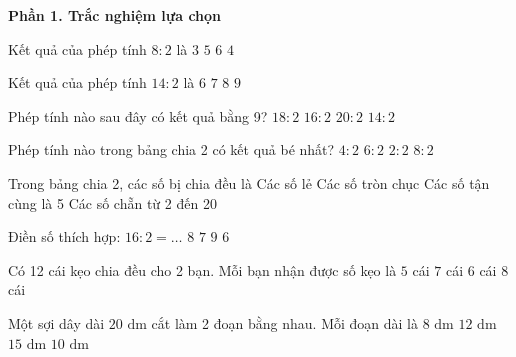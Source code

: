 \textbf{Phần 1. Trắc nghiệm lựa chọn}

\begin{ex} %
Kết quả của phép tính $8 : 2$ là
\choice
{$3$}
{$5$}
{$6$}
{\True $4$}
\end{ex}

\begin{ex} %
Kết quả của phép tính $14 : 2$ là
\choice
{$6$}
{\True $7$}
{$8$}
{$9$}
\end{ex}

\begin{ex} %
Phép tính nào sau đây có kết quả bằng 9?
\choice
{\True $18 : 2$}
{$16 : 2$}
{$20 : 2$}
{$14 : 2$}
\end{ex}

\begin{ex} %
Phép tính nào trong bảng chia 2 có kết quả bé nhất?
\choice
{$4 : 2$}
{$6 : 2$}
{\True $2 : 2$}
{$8 : 2$}
\end{ex}

\begin{ex} %
Trong bảng chia 2, các số bị chia đều là
\choice
{Các số lẻ}
{Các số tròn chục}
{Các số tận cùng là 5}
{\True Các số chẵn từ 2 đến 20}
\end{ex}

\begin{ex} %
Điền số thích hợp: $16 : 2 = \dots$
\choice
{\True $8$}
{$7$}
{$9$}
{$6$}
\end{ex}

\begin{ex} %
Có 12 cái kẹo chia đều cho 2 bạn. Mỗi bạn nhận được số kẹo là
\choice
{$5$ cái}
{$7$ cái}
{\True $6$ cái}
{$8$ cái}
\end{ex}

\begin{ex} %
Một sợi dây dài $20\text{ dm}$ cắt làm 2 đoạn bằng nhau. Mỗi đoạn dài là
\choice
{$8\text{ dm}$}
{$12\text{ dm}$}
{$15\text{ dm}$}
{\True $10\text{ dm}$}
\end{ex}

